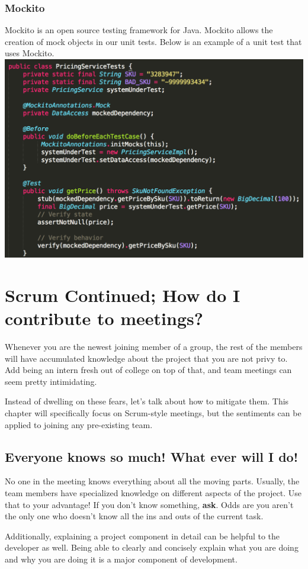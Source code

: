 \documentclass[oneside]{book}
\begin{document}
\subsection{Mockito}
Mockito is an open source testing framework for Java. Mockito allows the creation of mock objects in our unit tests. Below is an example of a unit test that uses Mockito.\\
\newline
\includegraphics[scale=0.55]{mockito.png}
\chapter{Scrum Continued; How do I contribute to meetings?}
Whenever you are the newest joining member of a group, the rest of the members will have accumulated knowledge about the project that you are not privy to. Add being an intern fresh out of college on top of that, and team meetings can seem pretty intimidating.\par
Instead of dwelling on these fears, let's talk about how to mitigate them. This chapter will specifically focus on Scrum-style meetings, but the sentiments can be applied to joining any pre-existing team.
\section{Everyone knows so much! What ever will I do!}
No one in the meeting knows everything about all the moving parts. Usually, the team members have specialized knowledge on different aspects of the project. Use that to your advantage! If you don't know something, \textbf{ask}. Odds are you aren't the only one who doesn't know all the ins and outs of the current task.\par
Additionally, explaining a project component in detail can be helpful to the developer as well. Being able to clearly and concisely explain what you are doing and why you are doing it is a major component of development. 
\end{document}
